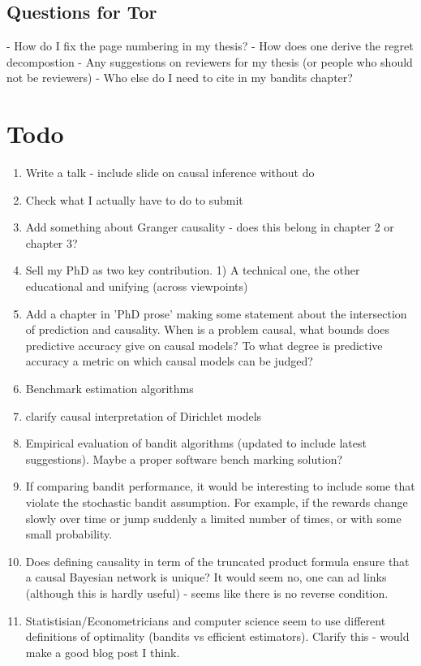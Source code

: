 


\section*{Questions for Tor}
- How do I fix the page numbering in my thesis?
- How does one derive the regret decompostion
- Any suggestions on reviewers for my thesis (or people who should not be reviewers)
- Who else do I need to cite in my bandits chapter?


\chapter*{Todo}
\begin{enumerate}
\item Write a talk - include slide on causal inference without do
\item Check what I actually have to do to submit
\item Add something about Granger causality - does this belong in chapter 2 or chapter 3?
\item Sell my PhD as two key contribution. 1) A technical one, the other educational and unifying (across viewpoints)
\item Add a chapter in 'PhD prose' making some statement about the intersection of prediction and causality. When is a problem causal, what bounds does predictive accuracy give on causal models? To what degree is predictive accuracy a metric on which causal models can be judged? 
\item Benchmark estimation algorithms
\item clarify causal interpretation of Dirichlet models
\item Empirical evaluation of bandit algorithms (updated to include latest suggestions). Maybe a proper software bench marking solution?
\item If comparing bandit performance, it would be interesting to include some that violate the stochastic bandit assumption. For example, if the rewards change slowly over time or jump suddenly a limited number of times, or with some small probability. 
\item Does defining causality in term of the truncated product formula ensure that a causal Bayesian network is unique? It would seem no, one can ad links (although this is hardly useful) - seems like there is no reverse condition. 
\item Statistisian/Econometricians and computer science seem to use different definitions of optimality (bandits vs efficient estimators). Clarify this - would make a good blog post I think. 
\end{enumerate}

